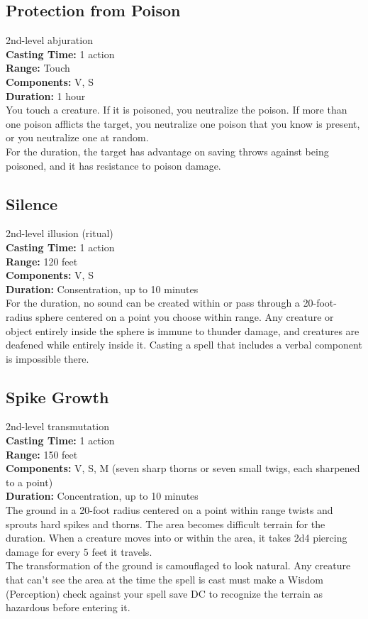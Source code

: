\documentclass[11pt, A4paper, english]{article}
\begin{document}
		\subsection{Protection from Poison}
2nd-level abjuration \\
\textbf{Casting Time:} 1 action \\
\textbf{Range:} Touch \\
\textbf{Components:} V, S \\
\textbf{Duration:} 1 hour \\
You touch a creature. If it is poisoned, you neutralize the poison. If more than one poison afflicts the target, you neutralize one poison that you know is present, or you neutralize one at random. \\
For the duration, the target has advantage on saving throws against being poisoned, and it has resistance to poison damage.

		\subsection{Silence}
2nd-level illusion (ritual) \\
\textbf{Casting Time:} 1 action \\
\textbf{Range:} 120 feet \\
\textbf{Components:} V, S \\
\textbf{Duration:} Consentration, up to 10 minutes \\
For the duration, no sound can be created within or pass through a 20-foot-radius sphere centered on a point you choose within range. Any creature or object entirely inside the sphere is immune to thunder damage, and creatures are deafened while entirely inside it. Casting a spell that includes a verbal component is impossible there.

		\subsection{Spike Growth}
2nd-level transmutation \\
\textbf{Casting Time:} 1 action \\
\textbf{Range:} 150 feet \\
\textbf{Components:} V, S, M (seven sharp thorns or seven small twigs, each sharpened to a point) \\
\textbf{Duration:} Concentration, up to 10 minutes \\
The ground in a 20-foot radius centered on a point within range twists and sprouts hard spikes and thorns. The area becomes difficult terrain for the duration. When a creature moves into or within the area, it takes 2d4 piercing damage for every 5 feet it travels. \\
The transformation of the ground is camouflaged to look natural. Any creature that can’t see the area at the time the spell is cast must make a Wisdom (Perception) check against your spell save DC to recognize the terrain as hazardous before entering it.
\end{document}
